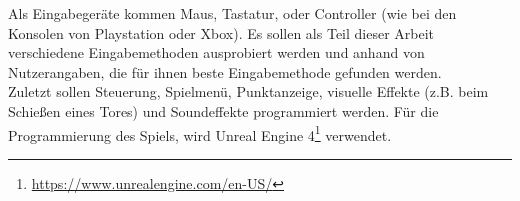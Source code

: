 Als Eingabegeräte kommen Maus, Tastatur, oder Controller (wie bei den Konsolen von Playstation oder Xbox). Es sollen als Teil dieser Arbeit verschiedene Eingabemethoden ausprobiert werden und anhand von Nutzerangaben, die für ihnen beste Eingabemethode gefunden werden.\\

Zuletzt sollen Steuerung, Spielmenü, Punktanzeige, visuelle Effekte (z.B. beim Schießen eines Tores) und Soundeffekte programmiert werden. Für die Programmierung des Spiels, wird Unreal Engine 4\footnote{\url{https://www.unrealengine.com/en-US/}} verwendet.\\